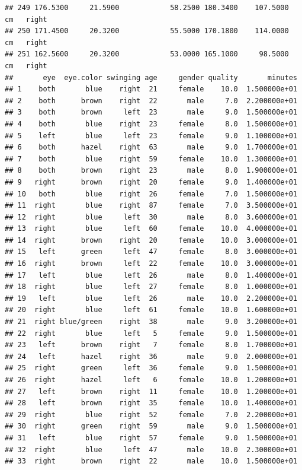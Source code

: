\documentclass[]{article}
\begin{document}
\begin{verbatim}
## 249 176.5300     21.5900            58.2500 180.3400    107.5000     cm   right
## 250 171.4500     20.3200            55.5000 170.1800    114.0000     cm   right
## 251 162.5600     20.3200            53.0000 165.1000     98.5000     cm   right
##       eye  eye.color swinging age     gender quality       minutes
## 1    both       blue    right  21     female    10.0  1.500000e+01
## 2    both      brown    right  22       male     7.0  2.200000e+01
## 3    both      brown     left  23       male     9.0  1.500000e+01
## 4    both       blue    right  23     female     8.0  1.500000e+01
## 5    left       blue     left  23     female     9.0  1.100000e+01
## 6    both      hazel    right  63       male     9.0  1.700000e+01
## 7    both       blue    right  59     female    10.0  1.300000e+01
## 8    both      brown    right  23       male     8.0  1.900000e+01
## 9   right      brown    right  20     female     9.0  1.400000e+01
## 10   both       blue    right  26     female     7.0  1.500000e+01
## 11  right       blue    right  87     female     7.0  3.500000e+01
## 12  right       blue     left  30       male     8.0  3.600000e+01
## 13  right       blue     left  60     female    10.0  4.000000e+01
## 14  right      brown    right  20     female    10.0  3.000000e+01
## 15   left      green     left  47     female     8.0  3.000000e+01
## 16  right      brown     left  22     female    10.0  3.000000e+01
## 17   left       blue     left  26       male     8.0  1.400000e+01
## 18  right       blue     left  27     female     8.0  1.000000e+01
## 19   left       blue     left  26       male    10.0  2.200000e+01
## 20  right       blue     left  61     female    10.0  1.600000e+01
## 21  right blue/green    right  38       male     9.0  3.200000e+01
## 22  right       blue     left   5     female     9.0  1.500000e+01
## 23   left      brown    right   7     female     8.0  1.700000e+01
## 24   left      hazel    right  36       male     9.0  2.000000e+01
## 25  right      green     left  36     female     9.0  1.500000e+01
## 26  right      hazel     left   6     female    10.0  1.200000e+01
## 27   left      brown    right  11     female    10.0  1.200000e+01
## 28   left      brown    right  35     female    10.0  1.400000e+01
## 29  right       blue    right  52     female     7.0  2.200000e+01
## 30  right      green    right  59       male     9.0  1.500000e+01
## 31   left       blue    right  57     female     9.0  1.500000e+01
## 32  right       blue     left  47       male    10.0  2.300000e+01
## 33  right      brown    right  22       male    10.0  1.500000e+01

\end{verbatim}
\end{document}

